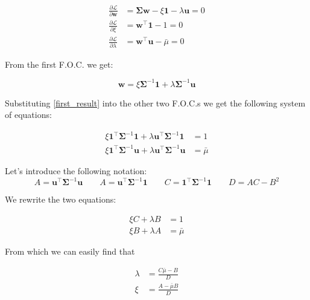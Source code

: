 \begin{equation} \label{focs}
\begin{split}
\frac{\partial \mathcal{L}}{\partial \mathbf{w}} &= \mathbf{\Sigma}\mathbf{w}  - \xi\mathbf{1} - \lambda\mathbf{u} = 0\\
\frac{\partial \mathcal{L}}{\partial \xi} &= \mathbf{w}^\top \mathbf{1} - 1 = 0\\
\frac{\partial \mathcal{L}}{\partial \lambda} &= \mathbf{w}^\top \mathbf{u} - \bar{\mu} = 0
\end{split}
\end{equation}

From the first F.O.C. we get:

\begin{equation} \label{first_result}
\mathbf{w} = \xi\mathbf{\Sigma}^{-1}\mathbf{1} + \lambda\mathbf{\Sigma}^{-1}\mathbf{u}
\end{equation}

Substituting \eqref{first_result} into the other two F.O.C.s we get the following system of equations:

\begin{equation} \label{focs}
\begin{split}
\xi \mathbf{1}^\top \mathbf{\Sigma}^{-1}\mathbf{1} + \lambda \mathbf{u}^\top \mathbf{\Sigma}^{-1}\mathbf{1} &= 1\\
\xi \mathbf{1}^\top \mathbf{\Sigma}^{-1}\mathbf{u} + \lambda \mathbf{u}^\top \mathbf{\Sigma}^{-1}\mathbf{u} &= \bar{\mu}
\end{split}
\end{equation}

Let's introduce the following notation:
$$
A = \mathbf{u}^\top \mathbf{\Sigma}^{-1}\mathbf{u} \qquad A = \mathbf{u}^\top \mathbf{\Sigma}^{-1}\mathbf{1} \qquad C = \mathbf{1}^\top \mathbf{\Sigma}^{-1}\mathbf{1} \qquad D = AC - B^2
$$

We rewrite the two equations:

\begin{equation} \label{focs_rewritten}
\begin{split}
\xi C + \lambda B &= 1\\
\xi B + \lambda A &= \bar{\mu}
\end{split}
\end{equation}

From which we can easily find that

\begin{equation} 
	\begin{split}
\lambda &= \frac{C\bar{\mu} - B}{D}\\
\xi     &= \frac{A - \bar{\mu}B}{D}
\end{split}
\end{equation}

